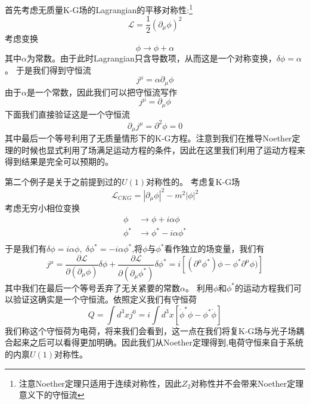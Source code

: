 首先考虑无质量K-G场的Lagrangian的平移对称性:\footnote{注意Noether定理只适用于连续对称性，因此$Z_{2}$对称性并不会带来Noether定理意义下的守恒流}
\begin{equation}
    \mathcal{L}=\frac{1}{2}(\partial_{\mu} \phi)^{2}
\end{equation}
考虑变换
\begin{equation}
    \phi \rightarrow \phi+\alpha
\end{equation}
其中$\alpha$为常数。由于此时Lagrangian只含导数项，从而这是一个对称变换，$\delta \phi=\alpha$。
于是我们得到守恒流
\begin{equation}
    j^{\mu}=\alpha \partial_{\mu}\phi
\end{equation}
由于$\alpha$是一个常数，因此我们可以把守恒流写作
\begin{equation}
    j^{\mu}=\partial_{\mu}\phi
\end{equation}
下面我们直接验证这是一个守恒流
\begin{equation}
    \partial_{\mu}j^{\mu}=\partial^{2}\phi=0
\end{equation}
其中最后一个等号利用了无质量情形下的K-G方程。注意到我们在推导Noether定理的时候也显式利用了场满足运动方程的条件，因此在这里我们利用了运动方程来得到结果是完全可以预期的。

第二个例子是关于之前提到过的$U(1)$对称性的。
考虑复K-G场
\begin{equation}
    \mathcal{L}_{CKG}=\left|\partial_{\mu}\phi\right|^{2}-m^{2}\left|\phi\right|^{2}
\end{equation}
考虑无穷小相位变换
\begin{equation}
\begin{aligned}
    \phi & \rightarrow \phi+i\alpha\phi \\
    \phi^{*} & \rightarrow \phi^{*}-i\alpha\phi^{*} \\
    \end{aligned}
\end{equation}
于是我们有$\delta \phi=i\alpha \phi,\;\delta \phi^{*}=-i\alpha \phi^{*}$,将$\phi$与$\phi^{*}$看作独立的场变量，我们有
\begin{equation}
    j^{\mu}=\frac{\partial \mathcal{L}}{\partial (\partial_{\mu}\phi)} \delta \phi+\frac{\partial \mathcal{L}}{\partial (\partial_{\mu}\phi^{*})} \delta \phi^{*}=i\left[(\partial^{\mu}\phi^{*})\phi-\phi^{*}\partial^{\mu}\phi)\right]
\end{equation}
其中我们在最后一个等号丢弃了无关紧要的常数$\alpha$。
利用$\phi$和$\phi^{*}$的运动方程我们可以验证这确实是一个守恒流。依照定义我们有守恒荷
\begin{equation}
\label{CKGQ}
    Q=\int d^{3}x j^{0}=i\int d^{3}x\left[\dot{\phi}^{*}\phi-\phi^{*}\dot{\phi}\right]
\end{equation}
我们称这个守恒荷为电荷，将来我们会看到，这一点在我们将复K-G场与光子场耦合起来之后可以看得更加明确。因此我们从Noether定理得到,电荷守恒来自于系统的内禀$U(1)$对称性。